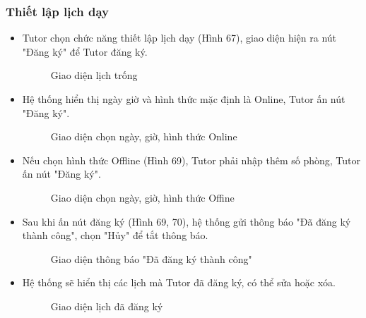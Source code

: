 \subsubsection*{Thiết lập lịch dạy}
\begin{itemize}
    \item Tutor chọn chức năng thiết lập lịch dạy (Hình 67), giao diện hiện ra nút "Đăng ký" để Tutor đăng ký. 
    \begin{figure}[H]
    \centering
    \setlength{\fboxsep}{2pt}     
    \setlength{\fboxrule}{0.5pt}   
    \caption{Giao diện lịch trống}
    \end{figure}
    \item Hệ thống hiển thị ngày giờ và hình thức mặc định là Online, Tutor ấn nút "Đăng ký".
    \begin{figure}[H]
    \centering
    \setlength{\fboxsep}{2pt}     
    \setlength{\fboxrule}{0.5pt}   
    \caption{Giao diện chọn ngày, giờ, hình thức Online}
    \end{figure}
    \item Nếu chọn hình thức Offline (Hình 69), Tutor phải nhập thêm số phòng, Tutor ấn nút "Đăng ký".
    \begin{figure}[H]
    \centering
    \setlength{\fboxsep}{2pt}     
    \setlength{\fboxrule}{0.5pt}   
    \caption{Giao diện chọn ngày, giờ, hình thức Offine}
    \end{figure}
    \item Sau khi ấn nút đăng ký (Hình 69, 70), hệ thống gửi thông báo "Đã đăng ký thành công", chọn "Hủy" để tắt thông báo.
    \begin{figure}[H]
    \centering
    \setlength{\fboxsep}{2pt}     
    \setlength{\fboxrule}{0.5pt}   
    \caption{Giao diện thông báo "Đã đăng ký thành công"}
    \end{figure}
    \item Hệ thống sẽ hiển thị các lịch mà Tutor đã đăng ký, có thể sửa hoặc xóa.
    \begin{figure}[H]
    \centering
    \setlength{\fboxsep}{2pt}     
    \setlength{\fboxrule}{0.5pt}   
    \caption{Giao diện lịch đã đăng ký}
    \end{figure}    

\end{itemize}
